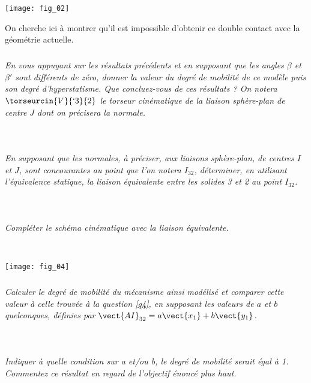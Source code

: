 \begin{multicols}{2}
\begin{center}
\texttt{[image: fig\_02]}
\end{center}
\begin{obj}
On cherche ici à montrer qu'il est impossible d'obtenir ce double contact avec la géométrie actuelle.
\end{obj}



\subparagraph{\label{q4}}\textit{En vous appuyant sur les résultats précédents et en supposant que les angles $\beta$ et $\beta'$ sont différents de zéro, donner la valeur du degré de mobilité de ce modèle puis son degré d'hyperstatisme. Que concluez-vous de ces résultats ? On notera $\torseurcin{V}{`3}{2}$ le torseur cinématique de la liaison sphère-plan de centre $J$ dont on précisera la normale.}
\ifprof
\begin{corrige}~\\
\end{corrige}
\else
\fi

\subparagraph{}\textit{En supposant que les normales, à préciser, aux liaisons sphère-plan, de centres $I$ et $J$, sont concourantes au point que l'on notera $I_{32}$, déterminer, en utilisant l'équivalence statique, la liaison équivalente entre les solides 3 et 2 au point $I_{32}$.}
\ifprof
\begin{corrige}~\\
\end{corrige}
\else
\fi

\subparagraph{}\textit{Compléter le schéma cinématique avec la liaison équivalente.}
\ifprof
\begin{corrige}~\\
\end{corrige}
\else
\fi
\begin{center}
\texttt{[image: fig\_04]}
\end{center}

\subparagraph{}\textit{Calculer le degré de mobilité du mécanisme ainsi modélisé et comparer cette valeur à celle trouvée à la question \ref{q4}, en supposant les valeurs de $a$ et $b$ quelconques, définies par $\vect{AI}_{32}=a\vect{x_1}+b\vect{y_1}$.}
\ifprof
\begin{corrige}~\\
\end{corrige}
\else
\fi

\subparagraph{}\textit{Indiquer à quelle condition sur a et/ou b, le degré de mobilité serait égal à 1. Commentez ce résultat en regard de l'objectif énoncé plus haut.}
\ifprof
\begin{corrige}~\\
\end{corrige}
\else
\fi


\end{multicols}
